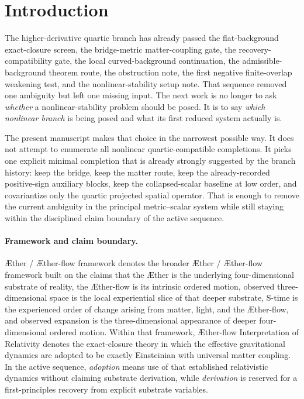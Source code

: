 \documentclass[11pt]{article}
\newcommand{\Aether}{\AE{}ther}
\newcommand{\Aflow}{\AE{}ther-flow}
\newcommand{\TheoryName}{\Aflow{} Interpretation of Relativity}
\newcommand{\TheoryProgram}{\Aether{} / \Aflow{} framework}
\begin{document}
\section{Introduction}

The higher-derivative quartic branch has already passed the flat-background exact-closure screen, the bridge-metric matter-coupling gate, the recovery-compatibility gate, the local curved-background continuation, the admissible-background theorem route, the obstruction note, the first negative finite-overlap weakening test, and the nonlinear-stability setup note. That sequence removed one ambiguity but left one missing input. The next work is no longer to ask \emph{whether} a nonlinear-stability problem should be posed. It is to say \emph{which nonlinear branch} is being posed and what its first reduced system actually is.

The present manuscript makes that choice in the narrowest possible way. It does not attempt to enumerate all nonlinear quartic-compatible completions. It picks one explicit minimal completion that is already strongly suggested by the branch history: keep the bridge, keep the matter route, keep the already-recorded positive-sign auxiliary blocks, keep the collapsed-scalar baseline at low order, and covariantize only the quartic projected spatial operator. That is enough to remove the current ambiguity in the principal metric--scalar system while still staying within the disciplined claim boundary of the active sequence.

\paragraph{Framework and claim boundary.}
\TheoryProgram{} denotes the broader \Aether{} / \Aflow{} framework built on the claims that the \Aether{} is the underlying four-dimensional substrate of reality, the \Aflow{} is its intrinsic ordered motion, observed three-dimensional space is the local experiential slice of that deeper substrate, S-time is the experienced order of change arising from matter, light, and the \Aflow{}, and observed expansion is the three-dimensional appearance of deeper four-dimensional ordered motion. Within that framework, \TheoryName{} denotes the exact-closure theory in which the effective gravitational dynamics are adopted to be exactly Einsteinian with universal matter coupling. In the active sequence, \emph{adoption} means use of that established relativistic dynamics without claiming substrate derivation, while \emph{derivation} is reserved for a first-principles recovery from explicit substrate variables.
\end{document}
